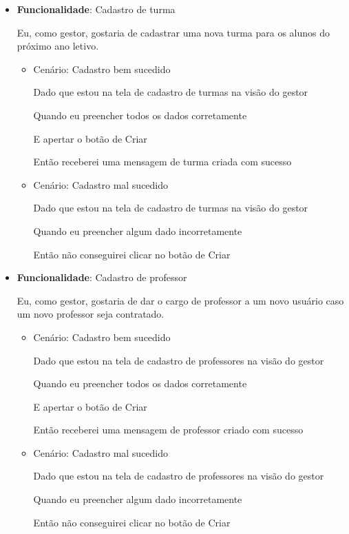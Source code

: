 \begin{itemize}
\item\textbf{Funcionalidade}: Cadastro de turma
    
    Eu, como gestor, gostaria de cadastrar uma nova turma para os alunos do próximo ano letivo.
    \begin{itemize}
        \item Cenário: Cadastro bem sucedido  
        \par Dado que estou na tela de cadastro de turmas na visão do gestor
        \par Quando eu preencher todos os dados corretamente
        \par E apertar o botão de Criar
        \par Então receberei uma mensagem de turma criada com sucesso
    \end{itemize}   
    \begin{itemize}
        \item Cenário: Cadastro mal sucedido  
        \par Dado que estou na tela de cadastro de turmas na visão do gestor
        \par Quando eu preencher algum dado incorretamente
        \par Então não conseguirei clicar no botão de Criar
    \end{itemize}   

\item\textbf{Funcionalidade}: Cadastro de professor
    
    Eu, como gestor, gostaria de dar o cargo de professor a um novo usuário caso um novo professor seja contratado.
    \begin{itemize}
        \item Cenário: Cadastro bem sucedido  
        \par Dado que estou na tela de cadastro de professores na visão do gestor
        \par Quando eu preencher todos os dados corretamente
        \par E apertar o botão de Criar
        \par Então receberei uma mensagem de professor criado com sucesso
    \end{itemize}   
    \begin{itemize}
        \item Cenário: Cadastro mal sucedido  
        \par Dado que estou na tela de cadastro de professores na visão do gestor
        \par Quando eu preencher algum dado incorretamente
        \par Então não conseguirei clicar no botão de Criar
    \end{itemize}   


\end{itemize}
